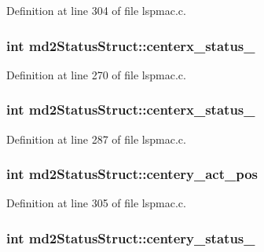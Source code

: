 Definition at line 304 of file lspmac.\-c.

\hypertarget{structmd2StatusStruct_aa619cdbd7a563408c6b825ddc4f74ebb}{
\subsubsection[{centerx\-\_\-status\-\_\-1}]{\setlength{\rightskip}{0pt plus 5cm}int md2\-Status\-Struct\-::centerx\-\_\-status\-\_}}\label{structmd2StatusStruct_aa619cdbd7a563408c6b825ddc4f74ebb}


Definition at line 270 of file lspmac.\-c.

\hypertarget{structmd2StatusStruct_ae4fad6debe138ed7815d463e83f8d0f6}{
\subsubsection[{centerx\-\_\-status\-\_\-2}]{\setlength{\rightskip}{0pt plus 5cm}int md2\-Status\-Struct\-::centerx\-\_\-status\-\_}}\label{structmd2StatusStruct_ae4fad6debe138ed7815d463e83f8d0f6}


Definition at line 287 of file lspmac.\-c.

\hypertarget{structmd2StatusStruct_a6be71a92a599d490ca808af8c7e7faa0}{
\subsubsection[{centery\-\_\-act\-\_\-pos}]{\setlength{\rightskip}{0pt plus 5cm}int md2\-Status\-Struct\-::centery\-\_\-act\-\_\-pos}}\label{structmd2StatusStruct_a6be71a92a599d490ca808af8c7e7faa0}


Definition at line 305 of file lspmac.\-c.

\hypertarget{structmd2StatusStruct_a57f65ebe28ef88f1c632d9f35d9167eb}{
\subsubsection[{centery\-\_\-status\-\_\-1}]{\setlength{\rightskip}{0pt plus 5cm}int md2\-Status\-Struct\-::centery\-\_\-status\-\_}}\label{structmd2StatusStruct_a57f65ebe28ef88f1c632d9f35d9167eb}


